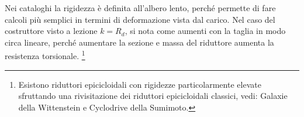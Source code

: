 Nei cataloghi la rigidezza è definita all'albero lento, perché permette di fare calcoli più semplici in termini di deformazione vista dal carico.
Nel caso del costruttore visto a lezione $k=R_d$, si nota come aumenti con la taglia in modo circa lineare, perché aumentare la sezione e massa del riduttore aumenta la resistenza torsionale. \footnote{Esistono riduttori epicicloidali con rigidezze particolarmente elevate sfruttando una rivisitazione dei riduttori epicicloidali classici, vedi: Galaxie della Wittenstein e Cyclodrive della Sumimoto.}